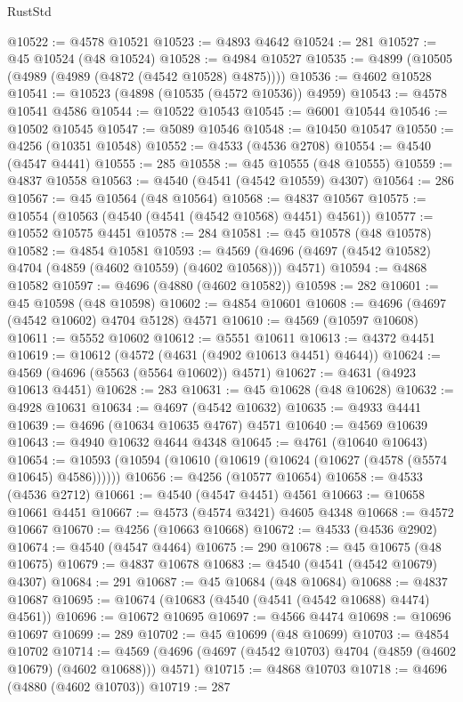 \begin{lexlean}{RustStd}
\begin{coremodule}
@10522 := @4578 @10521
@10523 := @4893 @4642
@10524 := 281
@10527 := @45 @10524 (@48 @10524)
@10528 := @4984 @10527
@10535 := @4899 (@10505 (@4989 (@4989 (@4872 (@4542 @10528) @4875))))
@10536 := @4602 @10528
@10541 := @10523 (@4898 (@10535 (@4572 @10536)) @4959)
@10543 := @4578 @10541 @4586
@10544 := @10522 @10543
@10545 := @6001 @10544
@10546 := @10502 @10545
@10547 := @5089 @10546
@10548 := @10450 @10547
@10550 := @4256 (@10351 @10548)
@10552 := @4533 (@4536 @2708)
@10554 := @4540 (@4547 @4441)
@10555 := 285
@10558 := @45 @10555 (@48 @10555)
@10559 := @4837 @10558
@10563 := @4540 (@4541 (@4542 @10559) @4307)
@10564 := 286
@10567 := @45 @10564 (@48 @10564)
@10568 := @4837 @10567
@10575 := @10554 (@10563 (@4540 (@4541 (@4542 @10568) @4451) @4561))
@10577 := @10552 @10575 @4451
@10578 := 284
@10581 := @45 @10578 (@48 @10578)
@10582 := @4854 @10581
@10593 := @4569 (@4696 (@4697 (@4542 @10582) @4704 (@4859 (@4602 @10559) (@4602 @10568))) @4571)
@10594 := @4868 @10582
@10597 := @4696 (@4880 (@4602 @10582))
@10598 := 282
@10601 := @45 @10598 (@48 @10598)
@10602 := @4854 @10601
@10608 := @4696 (@4697 (@4542 @10602) @4704 @5128) @4571
@10610 := @4569 (@10597 @10608)
@10611 := @5552 @10602
@10612 := @5551 @10611
@10613 := @4372 @4451
@10619 := @10612 (@4572 (@4631 (@4902 @10613 @4451) @4644))
@10624 := @4569 (@4696 (@5563 (@5564 @10602)) @4571)
@10627 := @4631 (@4923 @10613 @4451)
@10628 := 283
@10631 := @45 @10628 (@48 @10628)
@10632 := @4928 @10631
@10634 := @4697 (@4542 @10632)
@10635 := @4933 @4441
@10639 := @4696 (@10634 @10635 @4767) @4571
@10640 := @4569 @10639
@10643 := @4940 @10632 @4644 @4348
@10645 := @4761 (@10640 @10643)
@10654 := @10593 (@10594 (@10610 (@10619 (@10624 (@10627 (@4578 (@5574 @10645) @4586))))))
@10656 := @4256 (@10577 @10654)
@10658 := @4533 (@4536 @2712)
@10661 := @4540 (@4547 @4451) @4561
@10663 := @10658 @10661 @4451
@10667 := @4573 (@4574 @3421) @4605 @4348
@10668 := @4572 @10667
@10670 := @4256 (@10663 @10668)
@10672 := @4533 (@4536 @2902)
@10674 := @4540 (@4547 @4464)
@10675 := 290
@10678 := @45 @10675 (@48 @10675)
@10679 := @4837 @10678
@10683 := @4540 (@4541 (@4542 @10679) @4307)
@10684 := 291
@10687 := @45 @10684 (@48 @10684)
@10688 := @4837 @10687
@10695 := @10674 (@10683 (@4540 (@4541 (@4542 @10688) @4474) @4561))
@10696 := @10672 @10695
@10697 := @4566 @4474
@10698 := @10696 @10697
@10699 := 289
@10702 := @45 @10699 (@48 @10699)
@10703 := @4854 @10702
@10714 := @4569 (@4696 (@4697 (@4542 @10703) @4704 (@4859 (@4602 @10679) (@4602 @10688))) @4571)
@10715 := @4868 @10703
@10718 := @4696 (@4880 (@4602 @10703))
@10719 := 287

\end{coremodule}
\end{lexlean}
